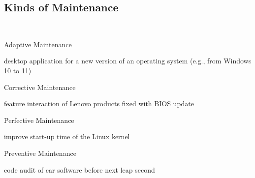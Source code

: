 \subsection{Kinds of Maintenance}
\begin{frame}{\myframetitle\ \mytitlesource{\ludewiglichter}}
	\begin{mycolumns}
		\begin{definition}{Adaptive Maintenance \mysource{\lientzswanson}}
			 \hfill {}
		\end{definition}
		\begin{example}{}
			desktop application for a new version of an operating system (e.g., from Windows 10 to 11)
		\end{example}
		\begin{definition}{Corrective Maintenance \mysource{\lientzswanson}}
			 \hfill {}
		\end{definition}
		\begin{example}{}
			feature interaction of Lenovo products fixed with BIOS update
		\end{example}
	\mynextcolumn
		\begin{definition}{Perfective Maintenance \mysource{\lientzswanson}}
			 \hfill {}
		\end{definition}
		\begin{example}{}
			improve start-up time of the Linux kernel
		\end{example}
		\begin{definition}{Preventive Maintenance \mysource{\lientzswanson}}
			 \hfill {}
		\end{definition}
		\begin{example}{}
			code audit of car software before next leap second
		\end{example}
	\end{mycolumns}
\end{frame}

